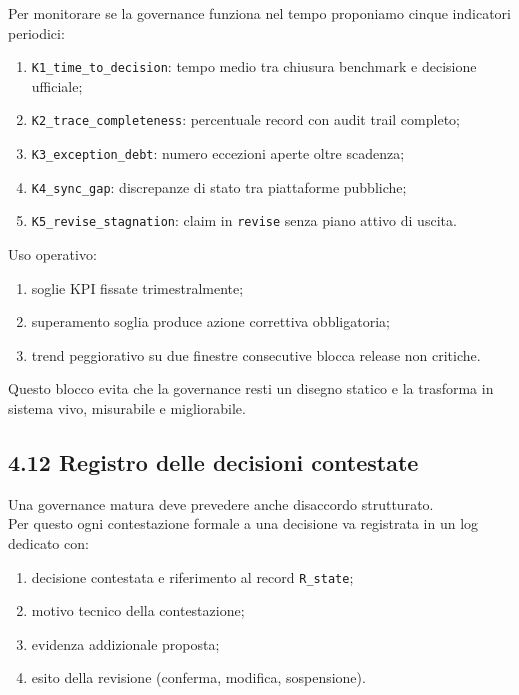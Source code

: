 Per monitorare se la governance funziona nel tempo proponiamo cinque indicatori periodici:

\begin{enumerate}
\def\labelenumi{\arabic{enumi}.}
\tightlist
\item
  \texttt{K1\_time\_to\_decision}: tempo medio tra chiusura benchmark e decisione ufficiale;
\item
  \texttt{K2\_trace\_completeness}: percentuale record con audit trail completo;
\item
  \texttt{K3\_exception\_debt}: numero eccezioni aperte oltre scadenza;
\item
  \texttt{K4\_sync\_gap}: discrepanze di stato tra piattaforme pubbliche;
\item
  \texttt{K5\_revise\_stagnation}: claim in \texttt{revise} senza piano attivo di uscita.
\end{enumerate}

Uso operativo:

\begin{enumerate}
\def\labelenumi{\arabic{enumi}.}
\tightlist
\item
  soglie KPI fissate trimestralmente;
\item
  superamento soglia produce azione correttiva obbligatoria;
\item
  trend peggiorativo su due finestre consecutive blocca release non critiche.
\end{enumerate}

Questo blocco evita che la governance resti un disegno statico e la trasforma in sistema vivo, misurabile e migliorabile.

\subsection{4.12 Registro delle decisioni contestate}

Una governance matura deve prevedere anche disaccordo strutturato.\\
Per questo ogni contestazione formale a una decisione va registrata in un log dedicato con:

\begin{enumerate}
\def\labelenumi{\arabic{enumi}.}
\tightlist
\item
  decisione contestata e riferimento al record \texttt{R\_state};
\item
  motivo tecnico della contestazione;
\item
  evidenza addizionale proposta;
\item
  esito della revisione (conferma, modifica, sospensione).
\end{enumerate}

